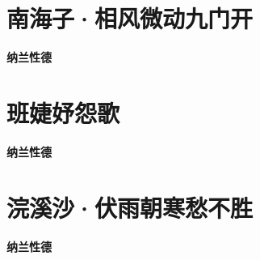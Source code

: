 \documentclass[12pt,a4paper]{ctexbook}
\begin{document}
\section{南海子·相风微动九门开}
\textbf{纳兰性德}\par\vspace{0.5em}

\section{班婕妤怨歌}
\textbf{纳兰性德}\par\vspace{0.5em}

\section{浣溪沙·伏雨朝寒愁不胜}
\textbf{纳兰性德}\par\vspace{0.5em}
\end{document}
